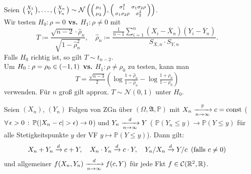 \documentclass{cheat-sheet}
\newcommand{\Alg}{\mathfrak{A}} %
\renewcommand{\P}{\mathbb{P}} %
\newcommand{\Cont}{\mathcal{C}} %
\newcommand{\testh}[1]{\textcolor{TestColor}{\textbf{#1}}}
\newcommand{\Normal}{\mathcal{N}} %
\begin{document}
\begin{test}
  Seien $\begin{psmallmatrix} X_1 \\ Y_1 \end{psmallmatrix}, \ldots, \begin{psmallmatrix} X_n \\ Y_n \end{psmallmatrix} \sim \Normal\left(
    \begin{psmallmatrix}
      \mu_1\vphantom{\sigma_1^2} \\
      \mu_2\vphantom{\sigma_2^2}
    \end{psmallmatrix},
    \begin{psmallmatrix}
      \sigma_1^2 & \sigma_1 \sigma_2 \rho \\
      \sigma_1 \sigma_2 \rho & \sigma_2^2
    \end{psmallmatrix} \right)$. \\[2pt]
  Wir testen \testh{$H_0 : \rho = 0$ vs. $H_1 : \rho \neq 0$} mit
  \[
    T \coloneqq \frac{\sqrt{n-2} \cdot \hat{\rho}_n}{\sqrt{1 - \hat{\rho}_n^2}}, \quad
    \hat{\rho}_n \coloneqq \frac{\tfrac{1}{n-1} \sum_{i=1}^n (X_i - \overline{X}_n) (Y_i - \overline{Y}_n)}{S_{X,n} \cdot S_{Y,n}}.
  \]
  Falls $H_0$ richtig ist, so gilt $T \sim t_{n-2}$. \\[2pt]
  Um \testh{$H_0 : \rho = \rho_0 \in \left( -1, 1 \right)$ vs. $H_1 : \rho \neq \rho_0$} zu testen, kann man
  \[ T = \tfrac{\sqrt{n-3}}{2} \left( \log \tfrac{1 + \hat{\rho}_n}{1 - \hat{\rho}_n} - \log \tfrac{1+\rho_0}{1-\rho_0} \right) \]
  verwenden.
  Für $n$ groß gilt approx. $T \sim \Normal(0, 1)$ unter $H_0$.
\end{test}


\begin{lem}
  Seien $(X_n)$, $(Y_n)$ Folgen von ZGn über $(\Omega, \Alg, \P)$ mit $X_n \xra[n \to \infty]{\P} c = \text{const}$ (\dh{} $\fa{\epsilon > 0} \P(\abs{X_n - c} > \epsilon) \to 0$) und $Y_n \xrightarrow[n \to \infty]{d} Y$ (\dh{} $\P(Y_n \leq y) \to \P(Y \leq y)$ für alle Stetigkeitspunkte $y$ der VF $y \mapsto \P(Y \leq y)$). Dann gilt:
  \[
    X_n + Y_n \xrightarrow{d} c + Y, \quad
    X_n \cdot Y_n \xrightarrow{d} c \cdot Y, \quad
    Y_n / X_n \xrightarrow{d} Y / c \enspace \text{(falls $c \neq 0$)}
  \]
  und allgemeiner $f(X_n, Y_n) \xrightarrow[n \to \infty]{d} f(c, Y)$ für jede Fkt $f \in \Cont(\R^2, \R)$.
\end{lem}
\end{document}
